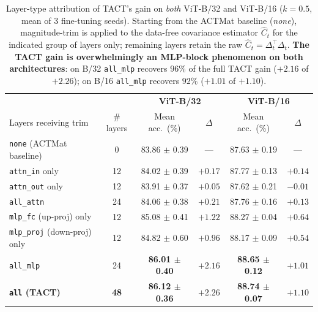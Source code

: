 \begin{table}[h]
\caption{Layer-type attribution of TACT's gain on \emph{both} ViT-B/32 and ViT-B/16 ($k=0.5$, mean of 3 fine-tuning seeds). Starting from the ACTMat baseline (\emph{none}), magnitude-trim is applied to the data-free covariance estimator $\hat C_t$ for the indicated group of layers only; remaining layers retain the raw $\hat C_t=\Delta_t^\top \Delta_t$. \textbf{The TACT gain is overwhelmingly an MLP-block phenomenon on both architectures}: on B/32 \texttt{all\_mlp} recovers $96\%$ of the full TACT gain ($+2.16$ of $+2.26$); on B/16 \texttt{all\_mlp} recovers $92\%$ ($+1.01$ of $+1.10$).}
\label{tab:layer_type}
\centering
\small
\setlength{\tabcolsep}{3pt}
\begin{tabular}{lc|cc|cc}
\toprule
 & & \multicolumn{2}{c|}{\textbf{ViT-B/32}} & \multicolumn{2}{c}{\textbf{ViT-B/16}} \\
Layers receiving trim & \# layers & Mean acc.~(\%) & $\Delta$ & Mean acc.~(\%) & $\Delta$ \\
\midrule
\texttt{none} (ACTMat baseline)  & 0  & 83.86 {\scriptsize $\pm$ 0.39} & ---       & 87.63 {\scriptsize $\pm$ 0.19} & --- \\
\midrule
\texttt{attn\_in} only            & 12 & 84.02 {\scriptsize $\pm$ 0.39} & $+0.17$   & 87.77 {\scriptsize $\pm$ 0.13} & $+0.14$ \\
\texttt{attn\_out} only           & 12 & 83.91 {\scriptsize $\pm$ 0.37} & $+0.05$   & 87.62 {\scriptsize $\pm$ 0.21} & $-0.01$ \\
\texttt{all\_attn}                & 24 & 84.06 {\scriptsize $\pm$ 0.38} & $+0.21$   & 87.76 {\scriptsize $\pm$ 0.16} & $+0.13$ \\
\midrule
\texttt{mlp\_fc} (up-proj) only    & 12 & 85.08 {\scriptsize $\pm$ 0.41} & $+1.22$   & 88.27 {\scriptsize $\pm$ 0.04} & $+0.64$ \\
\texttt{mlp\_proj} (down-proj) only & 12 & 84.82 {\scriptsize $\pm$ 0.60} & $+0.96$   & 88.17 {\scriptsize $\pm$ 0.09} & $+0.54$ \\
\texttt{all\_mlp}                 & 24 & \textbf{86.01 {\scriptsize $\pm$ 0.40}} & \textbf{$+2.16$}  & \textbf{88.65 {\scriptsize $\pm$ 0.12}} & \textbf{$+1.01$} \\
\midrule
\textbf{\texttt{all} (TACT)}      & \textbf{48} & \textbf{86.12 {\scriptsize $\pm$ 0.36}} & \textbf{$+2.26$}  & \textbf{88.74 {\scriptsize $\pm$ 0.07}} & \textbf{$+1.10$} \\
\bottomrule
\end{tabular}
\end{table}
